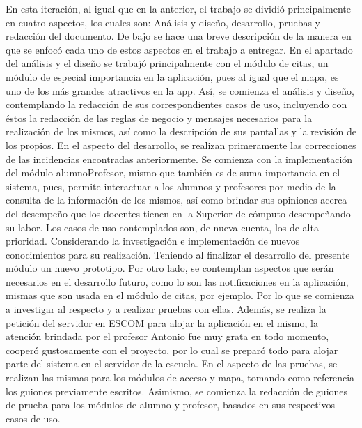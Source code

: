 \noindent
En esta iteración, al igual que en la anterior, el trabajo se dividió principalmente en cuatro aspectos, los cuales son: Análisis y diseño, desarrollo, pruebas y redacción del documento. De bajo se hace una breve descripción de la manera en que se enfocó cada uno de estos aspectos en el trabajo a entregar.
\newline
\newline
En el apartado del análisis y el diseño se trabajó principalmente con el módulo de citas, un módulo de especial importancia en la aplicación, pues al igual que el mapa, es uno de los más grandes atractivos en la app. Así, se comienza el análisis y diseño, contemplando la redacción de sus correspondientes casos de uso, incluyendo con éstos la redacción de las reglas de negocio y mensajes necesarios para la realización de los mismos, así como la descripción de sus pantallas y la revisión de los propios. 
\newline
\newline
En el aspecto del desarrollo, se realizan primeramente las correcciones de las incidencias encontradas anteriormente. Se comienza con la implementación del módulo alumnoProfesor, mismo que también es de suma importancia en el sistema, pues, permite interactuar a los alumnos y profesores por medio de la consulta de la información de los mismos, así como brindar sus opiniones acerca del desempeño que los docentes tienen en la Superior de cómputo desempeñando su labor. Los casos de uso contemplados son, de nueva cuenta, los de alta prioridad. Considerando la investigación e implementación de nuevos conocimientos para su realización. Teniendo al finalizar el desarrollo del presente módulo un nuevo prototipo. 
\newline
Por otro lado, se contemplan aspectos que serán necesarios en el desarrollo futuro, como lo son las notificaciones en la aplicación, mismas que son usada en el módulo de citas, por ejemplo. Por lo que se comienza a investigar al respecto y a realizar pruebas con ellas. 
\newline
Además, se realiza la petición del servidor en ESCOM para alojar la aplicación en el mismo, la atención brindada por el profesor Antonio fue muy grata en todo momento, cooperó gustosamente con el proyecto, por lo cual se preparó todo para alojar parte del sistema en el servidor de la escuela.
\newline
\newline
En el aspecto de las pruebas, se realizan las mismas para los módulos de acceso y mapa, tomando como referencia los guiones previamente escritos. Asimismo, se comienza la redacción de guiones de prueba para los módulos de alumno y profesor, basados en sus respectivos casos de uso. 
